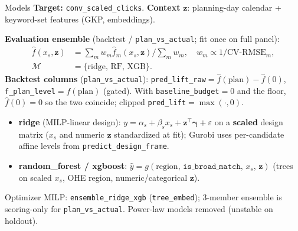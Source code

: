 \documentclass[11pt]{beamer}
\begin{document}
\begin{frame}{Models}
  \footnotesize
  \textbf{Target:} \texttt{conv\_scaled\_clicks}.
  \textbf{Context} $\mathbf{z}$: planning-day calendar + keyword-set features (GKP, embeddings).

  \vspace{0.2em}
  \textbf{Evaluation ensemble} (backtest / \texttt{plan\_vs\_actual}; fit once on full panel):
  \begin{align*}
    \hat f(x_s,\mathbf{z})
      &= \textstyle\sum_m w_m \hat f_m(x_s,\mathbf{z}) \big/ \textstyle\sum_m w_m,
      \quad w_m \propto 1/\mathrm{CV\mbox{-}RMSE}_m,\\
    \mathcal{M} &= \{\text{ridge},\,\text{RF},\,\text{XGB}\}.
  \end{align*}
  \textbf{Backtest columns} (\texttt{plan\_vs\_actual}):
  \texttt{pred\_lift\_raw}$=\hat f(\text{plan})-\hat f(0)$,
  \texttt{f\_plan\_level}$=\hat f(\text{plan})$ (gated).
  With \texttt{baseline\_budget}${=}0$ and the floor, $\hat f(0){=}0$ so the two coincide; clipped \texttt{pred\_lift}${=}\max(\cdot,0)$.

  \vspace{0.15em}
  \begin{itemize}
    \item \textbf{ridge} (MILP-linear design):
      $y=\alpha_s+\beta_s x_s+\mathbf{z}^\top\boldsymbol{\gamma}+\varepsilon$ on a
      \textbf{scaled} design matrix ($x_s$ and numeric $\mathbf{z}$ standardized at fit);
      Gurobi uses per-candidate affine levels from \texttt{predict\_design\_frame}.
    \item \textbf{random\_forest / xgboost}: $\hat y = g(\text{region},\,\texttt{is\_broad\_match},\,x_s,\,\mathbf{z})$
      (trees on scaled $x_s$, OHE region, numeric/categorical $\mathbf{z}$).
  \end{itemize}
  {\scriptsize Optimizer MILP: \texttt{ensemble\_ridge\_xgb} (\texttt{tree\_embed}); 3-member ensemble is scoring-only for \texttt{plan\_vs\_actual}. Power-law models removed (unstable on holdout).}

  \vspace{0.1em}
  \normalsize
\end{frame}
\end{document}
